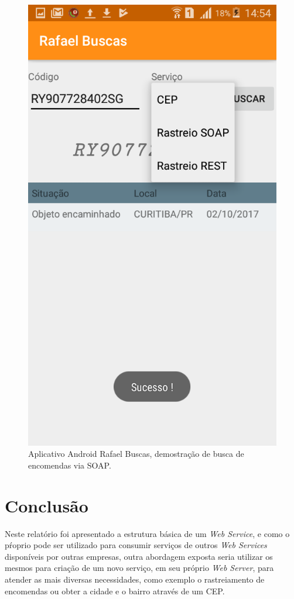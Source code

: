 \documentclass[a4paper, 12pt]{article}
\begin{document}
\begin{figure}[H]
	\centering
	\includegraphics[scale=0.2]{Imagens/android.png}
	\caption{Aplicativo Android Rafael Buscas, demostração de busca de encomendas via SOAP.}
	\label{and}
\end{figure}

\section{Conclusão}
Neste relatório foi apresentado a estrutura básica de um \textit{Web Service}, e como o pŕoprio pode ser utilizado para consumir serviços de outros \textit{Web Services} disponíveis por outras empresas, outra abordagem exposta seria utilizar os mesmos para criação de um novo serviço, em seu próprio \textit{Web Server}, para atender as mais diversas necessidades, como exemplo o rastreiamento de encomendas ou obter a cidade e o bairro através de um CEP.	  	


\end{document}
